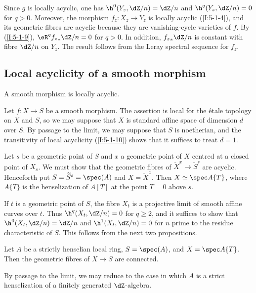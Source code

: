 Since $g$ is locally acyclic, one has $\h^0(Y_z,\dZ/n)=\dZ/n$ and
$\h^q(Y_z,\dZ/n)=0$ for $q>0$. Moreover, the morphism
$f_z:X_z\to Y_z$ is locally acyclic (\ref{I:5-1-4}), and its geometric
fibres are acyclic because they are vanishing-cycle varieties of $f$.
By (\ref{I:5-1-9}), $\eR^q{f_z}_*\dZ/n=0$ for $q>0$. In addition,
${f_z}_*\dZ/n$ is constant with fibre $\dZ/n$ on $Y_z$. The result
follows from the Leray spectral sequence for $f_z$.

\subsection{Local acyclicity of a smooth morphism}\label{I:5-2}

\begin{theorem}\label{I:5-2-1}
A smooth morphism is locally acyclic.
\end{theorem}

Let $f:X\to S$ be a smooth morphism. The assertion is local for the étale
topology on $X$ and $S$, so we may suppose that $X$ is standard affine
space of dimension $d$ over $S$. By passage to the limit, we may suppose
that $S$ is noetherian, and the transitivity of local acyclicity
(\ref{I:5-1-10}) shows that it suffices to treat $d=1$.

Let $s$ be a geometric point of $S$ and $x$ a geometric point of $X$
centred at a closed point of $X_s$. We must show that the geometric fibres
of $\widetilde X^x\to\widetilde S^s$ are acyclic. Henceforth put
$S=\widetilde S^s=\spec(A)$ and $X=\widetilde X^x$. Then
$X\simeq\spec A\{T\}$, where $A\{T\}$ is the henselization of $A[T]$
at the point $T=0$ above $s$.

If $t$ is a geometric point of $S$, the fibre $X_t$ is a projective
limit of smooth affine curves over $t$. Thus $\h^q(X_t,\dZ/n)=0$ for
$q\geqslant2$, and it suffices to show that
$\h^0(X_t,\dZ/n)=\dZ/n$ and $\h^1(X_t,\dZ/n)=0$ for $n$ prime to the
residue characteristic of $S$. This follows from the next two
propositions.

\begin{proposition}\label{I:5-2-2}
Let $A$ be a strictly henselian local ring, $S=\spec(A)$, and
$X=\spec A\{T\}$. Then the geometric fibres of $X\to S$ are connected.
\end{proposition}

By passage to the limit, we may reduce to the case in which $A$ is a
strict henselization of a finitely generated $\dZ$-algebra.

